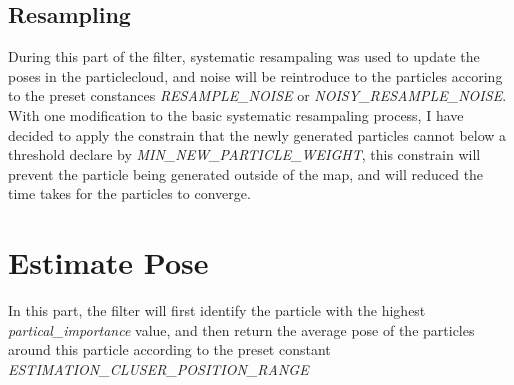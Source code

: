 \documentclass[11pt,a4paper]{article}
\begin{document}
      \subsection{Resampling}
      During this part of the filter, systematic resampaling was used to update the poses in 
      the particlecloud, and noise will be reintroduce to the particles accoring to the preset constances
      \textit{RESAMPLE\_NOISE} or \textit{NOISY\_RESAMPLE\_NOISE}. With one modification to the
      basic systematic resampaling process, I have decided to apply the constrain that the newly
      generated particles cannot below a threshold declare by \textit{MIN\_NEW\_PARTICLE\_WEIGHT},
      this constrain will prevent the particle being generated outside of the map, and will reduced
      the time takes for the particles to converge.
      
  \section{Estimate Pose}
  In this part, the filter will first identify the particle with the highest \textit{partical\_importance} value,
  and then return the average pose of the particles around this particle according to the preset
  constant \textit{ESTIMATION\_CLUSER\_POSITION\_RANGE}
  \newpage
\end{document}
